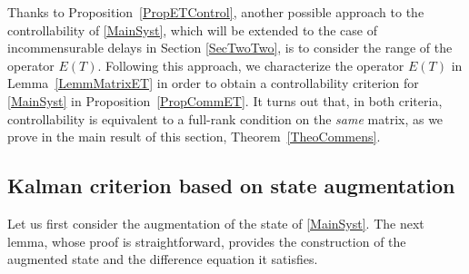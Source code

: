 \documentclass[JEP,XML,SOM,Unicode]{cedram}
\theoremstyle{plain}
\theoremstyle{definition}
\begin{document}
Thanks to Proposition~\ref{PropETControl}, another possible approach to the controllability of \eqref{MainSyst}, which will be extended to the case of incommensurable delays in Section \ref{SecTwoTwo}, is to consider the range of the operator $E(T)$. Following this approach, we characterize the operator $E(T)$ in Lemma~\ref{LemmMatrixET} in order to obtain a controllability criterion for \eqref{MainSyst} in Proposition~\ref{PropCommET}. It turns out that, in both criteria, controllability is equivalent to a full-rank condition on the \emph{same} matrix, as we prove in the main result of this section, Theorem~\ref{TheoCommens}.

\subsection{Kalman criterion based on state augmentation}

Let us first consider the augmentation of the state of \eqref{MainSyst}. The next lemma, whose proof is straightforward, provides the construction of the augmented state and the difference equation it satisfies.
\end{document}
